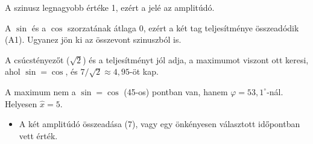 A szinusz legnagyobb értéke 1, ezért a jelé az amplitúdó.

\begin{center}\end{center}

A $\sin$ és a $\cos$ szorzatának átlaga 0, ezért a két tag teljesítménye összeadódik (A1). Ugyanez jön ki az összevont szinuszból is.

\begin{center}\end{center}

\begin{center}\end{center}



\begin{center}\end{center}
\begin{tipp}
A csúcstényezőt ($\sqrt2$) és a teljesítményt jól adja, a maximumot viszont ott keresi, ahol $\sin=\cos$, és $7/\sqrt2\approx4{,}95$-öt kap.
\end{tipp}
\begin{figyelem}[Javítás]
A maximum nem a $\sin=\cos$ (45\textdegree{}-os) pontban van, hanem $\varphi=53{,}1^{\circ}$-nál. Helyesen $\hat x=5$.
\end{figyelem}
\begin{eredmeny}

\begin{center}\end{center}
\end{eredmeny}
\begin{figyelem}
\begin{itemize}
\item A két amplitúdó összeadása ($7$), vagy egy önkényesen választott időpontban vett érték.
\end{itemize}
\end{figyelem}



